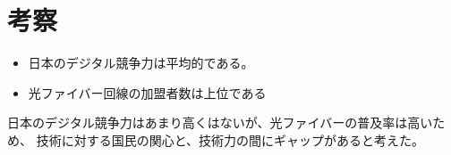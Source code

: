 \documentclass[a4paper,11pt,dvipdfmx]{ujarticle}
\begin{document}
\section{考察}
\begin{itemize}
    \item 日本のデジタル競争力は平均的である。
    \item 光ファイバー回線の加盟者数は上位である
\end{itemize}
日本のデジタル競争力はあまり高くはないが、光ファイバーの普及率は高いため、
技術に対する国民の関心と、技術力の間にギャップがあると考えた。





%

%




\end{document}
